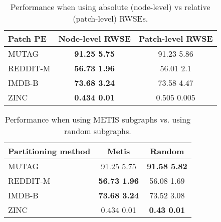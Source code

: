 \documentclass{article} \usepackage{iclr2024_conference,times}
\begin{document}
\begin{table}
    \centering
    \caption{Hyperparameters regarding the Graph-JEPA design for the TUD datasets.}
    \label{tab:hyperparams-app}  
\end{table}

\begin{table}
    \centering
    \caption{Performance when using absolute (node-level) vs relative (patch-level) RWSEs.}
    \begin{tabular}{|l|c|c|}
    \hline
    Patch PE & Node-level RWSE & Patch-level RWSE \\ \hline
    MUTAG    & \textbf{91.25  5.75} & 91.23  5.86 \\ \hline
    REDDIT-M & \textbf{56.73  1.96} & 56.01  2.1 \\ \hline
    IMDB-B   & \textbf{73.68  3.24} & 73.58  4.47 \\ \hline
    ZINC     & \textbf{0.434  0.01} & 0.505  0.005 \\ \hline
    \end{tabular}
    \label{tab:ablation_posemb}
\end{table}

\begin{table}
    \centering
    \caption{Performance when using METIS subgraphs vs. using random subgraphs.}
    \begin{tabular}{|l|c|c|}
    \hline
    Partitioning method & Metis & Random \\    \hline
    MUTAG    & 91.25  5.75  &  \textbf{91.58  5.82}\\ \hline
    REDDIT-M & \textbf{56.73  1.96}  &  56.08  1.69\\ \hline
    IMDB-B   & \textbf{73.68  3.24}  &  73.52  3.08\\ \hline
    ZINC     & 0.434  0.01  &  \textbf{0.43   0.01}\\ \hline
    \end{tabular}
    \label{tab:ablation_patches}
\end{table}
\end{document}
